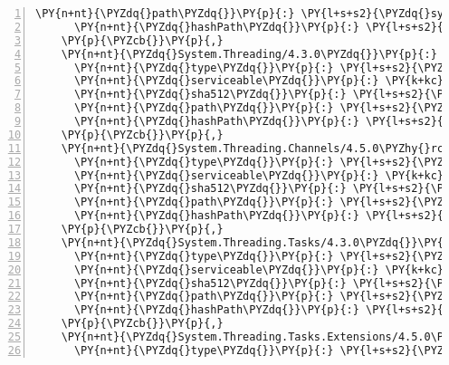 \begin{Verbatim}[commandchars=\\\{\},numbers=left,firstnumber=1,stepnumber=1,numberblanklines=0]
      \PY{n+nt}{\PYZdq{}path\PYZdq{}}\PY{p}{:} \PY{l+s+s2}{\PYZdq{}system.text.regularexpressions/4.3.0\PYZdq{}}\PY{p}{,}
      \PY{n+nt}{\PYZdq{}hashPath\PYZdq{}}\PY{p}{:} \PY{l+s+s2}{\PYZdq{}system.text.regularexpressions.4.3.0.nupkg.sha512\PYZdq{}}
    \PY{p}{\PYZcb{}}\PY{p}{,}
    \PY{n+nt}{\PYZdq{}System.Threading/4.3.0\PYZdq{}}\PY{p}{:} \PY{p}{\PYZob{}}
      \PY{n+nt}{\PYZdq{}type\PYZdq{}}\PY{p}{:} \PY{l+s+s2}{\PYZdq{}package\PYZdq{}}\PY{p}{,}
      \PY{n+nt}{\PYZdq{}serviceable\PYZdq{}}\PY{p}{:} \PY{k+kc}{true}\PY{p}{,}
      \PY{n+nt}{\PYZdq{}sha512\PYZdq{}}\PY{p}{:} \PY{l+s+s2}{\PYZdq{}sha512\PYZhy{}VkUS0kOBcUf3Wwm0TSbrevDDZ6BlM+b/HRiapRFWjM5O0NS0LviG0glKmFK+hhPDd1XFeSdU1GmlLhb2CoVpIw==\PYZdq{}}\PY{p}{,}
      \PY{n+nt}{\PYZdq{}path\PYZdq{}}\PY{p}{:} \PY{l+s+s2}{\PYZdq{}system.threading/4.3.0\PYZdq{}}\PY{p}{,}
      \PY{n+nt}{\PYZdq{}hashPath\PYZdq{}}\PY{p}{:} \PY{l+s+s2}{\PYZdq{}system.threading.4.3.0.nupkg.sha512\PYZdq{}}
    \PY{p}{\PYZcb{}}\PY{p}{,}
    \PY{n+nt}{\PYZdq{}System.Threading.Channels/4.5.0\PYZhy{}rc1\PYZdq{}}\PY{p}{:} \PY{p}{\PYZob{}}
      \PY{n+nt}{\PYZdq{}type\PYZdq{}}\PY{p}{:} \PY{l+s+s2}{\PYZdq{}package\PYZdq{}}\PY{p}{,}
      \PY{n+nt}{\PYZdq{}serviceable\PYZdq{}}\PY{p}{:} \PY{k+kc}{true}\PY{p}{,}
      \PY{n+nt}{\PYZdq{}sha512\PYZdq{}}\PY{p}{:} \PY{l+s+s2}{\PYZdq{}sha512\PYZhy{}XwRZGshtzdnofX1atTDBLHkyfR9HJDE1+/IhamW4NAkpENaY5DhENdsUcSRNfaygpj9EmwZgtLDZiVqMLDxGwg==\PYZdq{}}\PY{p}{,}
      \PY{n+nt}{\PYZdq{}path\PYZdq{}}\PY{p}{:} \PY{l+s+s2}{\PYZdq{}system.threading.channels/4.5.0\PYZhy{}rc1\PYZdq{}}\PY{p}{,}
      \PY{n+nt}{\PYZdq{}hashPath\PYZdq{}}\PY{p}{:} \PY{l+s+s2}{\PYZdq{}system.threading.channels.4.5.0\PYZhy{}rc1.nupkg.sha512\PYZdq{}}
    \PY{p}{\PYZcb{}}\PY{p}{,}
    \PY{n+nt}{\PYZdq{}System.Threading.Tasks/4.3.0\PYZdq{}}\PY{p}{:} \PY{p}{\PYZob{}}
      \PY{n+nt}{\PYZdq{}type\PYZdq{}}\PY{p}{:} \PY{l+s+s2}{\PYZdq{}package\PYZdq{}}\PY{p}{,}
      \PY{n+nt}{\PYZdq{}serviceable\PYZdq{}}\PY{p}{:} \PY{k+kc}{true}\PY{p}{,}
      \PY{n+nt}{\PYZdq{}sha512\PYZdq{}}\PY{p}{:} \PY{l+s+s2}{\PYZdq{}sha512\PYZhy{}LbSxKEdOUhVe8BezB/9uOGGppt+nZf6e1VFyw6v3DN6lqitm0OSn2uXMOdtP0M3W4iMcqcivm2J6UgqiwwnXiA==\PYZdq{}}\PY{p}{,}
      \PY{n+nt}{\PYZdq{}path\PYZdq{}}\PY{p}{:} \PY{l+s+s2}{\PYZdq{}system.threading.tasks/4.3.0\PYZdq{}}\PY{p}{,}
      \PY{n+nt}{\PYZdq{}hashPath\PYZdq{}}\PY{p}{:} \PY{l+s+s2}{\PYZdq{}system.threading.tasks.4.3.0.nupkg.sha512\PYZdq{}}
    \PY{p}{\PYZcb{}}\PY{p}{,}
    \PY{n+nt}{\PYZdq{}System.Threading.Tasks.Extensions/4.5.0\PYZhy{}rc1\PYZdq{}}\PY{p}{:} \PY{p}{\PYZob{}}
      \PY{n+nt}{\PYZdq{}type\PYZdq{}}\PY{p}{:} \PY{l+s+s2}{\PYZdq{}package\PYZdq{}}\PY{p}{,}

\end{Verbatim}
